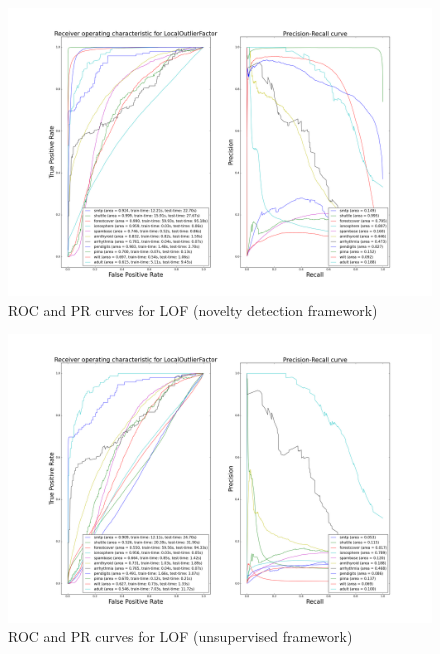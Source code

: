 \begin{figure}[!ht]
  \caption{ROC and PR curves for LOF (novelty detection framework)}
  \label{ocrf:fig:lof_roc_pr}
  \centering
  \includegraphics[trim=175 80 175 123, clip, width=\linewidth]{fig_source/ocrf_fig/bench_lof_roc_pr_supervised_factorized.png}
\end{figure}
\begin{figure}[!ht]
  \caption{ROC and PR curves for LOF (unsupervised framework)}
  \label{ocrf:fig:lof_roc_pr_unsupervised}
  \centering
  \includegraphics[trim=175 80 175 123, clip, width=\linewidth]{fig_source/ocrf_fig/bench_lof_roc_pr_unsupervised_factorized.png}
\end{figure}


